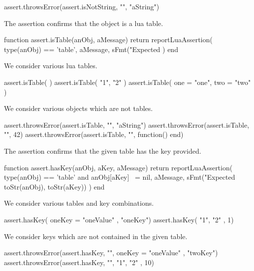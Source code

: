\startLuaTest
  assert.throwsError(assert.isNotString, "", "aString")
\stopLuaTest
\stopTestCase

\stopTestSuite


The  assertion confirms that the object is a lua 
table. 

\startLuaCode
function assert.isTable(anObj, aMessage)
  return reportLuaAssertion(
    type(anObj) == 'table',
    aMessage,
    sFmt("Expected %
  )
end
\stopLuaCode


We consider various lua tables.

\startLuaTest
  assert.isTable({ })
  assert.isTable({ "1", "2" })
  assert.isTable({ one = "one", two = "two" })
\stopLuaTest
\stopTestCase


We consider various objects which are not tables. 

\startLuaTest
  assert.throwsError(assert.isTable, "", "aString")
  assert.throwsError(assert.isTable, "", 42)
  assert.throwsError(assert.isTable, "", function() end)
\stopLuaTest
\stopTestCase

\stopTestSuite


The  assertion confirms that the given table has the 
key provided. 

\startLuaCode
function assert.hasKey(anObj, aKey, aMessage)
  return reportLuaAssertion(
    type(anObj) == 'table' and anObj[aKey] ~= nil,
    aMessage,
    sFmt("Expected %
      toStr(anObj), toStr(aKey))
  )
end
\stopLuaCode


We consider various tables and key combinations.

\startLuaTest
  assert.hasKey({ oneKey = "oneValue" }, "oneKey")
  assert.hasKey({ "1", "2" }, 1)
\stopLuaTest
\stopTestCase


We consider keys which are not contained in the given table. 

\startLuaTest
  assert.throwsError(assert.hasKey, "",
    { oneKey = "oneValue" }, "twoKey")
  assert.throwsError(assert.hasKey, "",
    { "1", "2" }, 10)
\stopLuaTest
\stopTestCase

